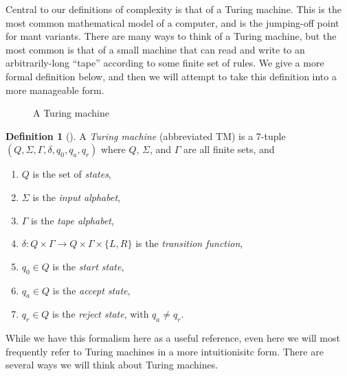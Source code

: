 \documentclass[english,12pt]{reedthesis}
\theoremstyle{plain}
\theoremstyle{definition}
\newtheorem{defn}[defn]{Definition}
\theoremstyle{remark}
\begin{document}
Central to our definitions of complexity is that of a Turing machine. This is
the most common mathematical model of a computer, and is the jumping-off point
for mant variants. There are many ways to think of a Turing machine, but the
most common is that of a small machine that can read and write to an
arbitrarily-long ``tape'' according to some finite set of rules. We give a more
formal definition below, and then we will attempt to take this definition into a
more manageable form.

\begin{figure}[htbp]
  \centering
  \caption{A Turing machine}\label{fig:tm}
\end{figure}

\begin{defn}[{\cite[Def.\ 3.1]{Sip97}}]\label{def:TM}
  A \emph{Turing machine} (abbreviated TM) is a 7-tuple
  $(Q, \Sigma, \Gamma, \delta, q_{0}, q_{a}, q_{r})$ where $Q$, $\Sigma$, and $\Gamma$ are all finite
  sets, and
  \begin{enumerate}
    \item $Q$ is the set of \emph{states},
    \item $\Sigma$ is the \emph{input alphabet},
    \item $\Gamma$ is the \emph{tape alphabet},
    \item $\delta\colon Q \times \Gamma \rightarrow Q \times \Gamma \times \{L, R\}$ is the \emph{transition function},
    \item $q_{0} \in Q$ is the \emph{start state},
    \item $q_{a} \in Q$ is the \emph{accept state},
    \item $q_{r} \in Q$ is the \emph{reject state}, with $q_{a} \ne q_{r}$.
  \end{enumerate}
\end{defn}

While we have this formalism here as a useful reference, even here we will most
frequently refer to Turing machines in a more intuitionisitc form. There are
several ways we will think about Turing machines.
\end{document}
